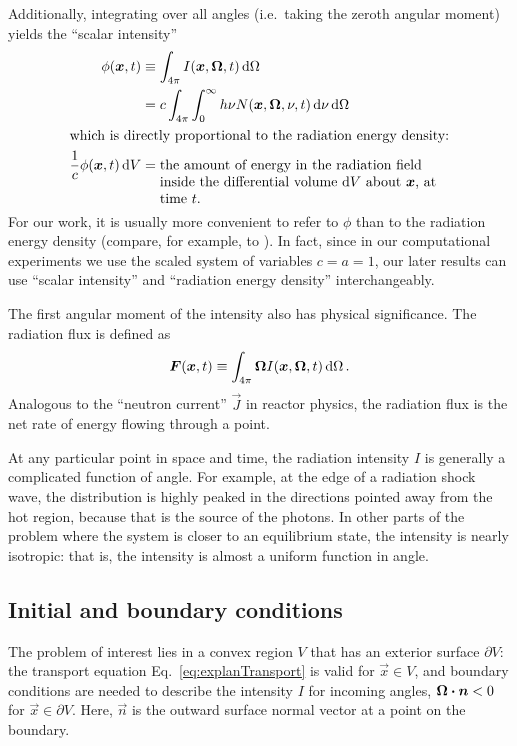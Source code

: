 Additionally, integrating over all angles (i.e.~taking the zeroth angular
moment) yields the ``scalar intensity''
\begin{align} \label{eq:intensityZeroth}
  \phi(\vec{x},t) &\equiv \int_{4\pi} I(\vec{x},\vec{\Omega}, t) \ud \Omega
  \\
  &= c \int_{4\pi} \int_0^\infty h\nu N(\vec{x},\vec{\Omega},\nu, t) \ud\nu
   \ud \Omega
\\ \intertext{which is directly proportional to the radiation energy density:}
\nonumber
\frac{1}{c} \phi(\vec{x},t) \ud V
&= \topbox{the amount of energy in the radiation field inside the differential
  volume $\ud V$ about $\vec{x}$, at time $t$.}
\end{align}
For our work, it is usually more convenient to refer to $\phi$ than to the
radiation energy density (compare, for example, \cite{Den2007} to
\cite{Kno1999a}). In fact, since in our computational experiments we use the
scaled system of variables $c=a=1$, our later results can use ``scalar
intensity'' and ``radiation energy density'' interchangeably.

The first angular moment of the intensity also has physical significance. The
radiation flux is defined as
\begin{equation} \label{eq:intensityFirst}
  \bm{F}(\bm{x},t) \equiv \int_{4\pi} \bm{\Omega}
  I(\bm{x},\bm{\Omega}, t) \mathop{}\!\mathrm{d} \Omega \,.
\end{equation}
Analogous to the ``neutron current'' $\vec{J}$ in reactor physics, the
radiation flux is the net rate of energy flowing through a point.

At any particular point in space and time, the radiation intensity $I$ is
generally a complicated function of angle. For example, at the edge of a
radiation shock wave, the distribution is highly peaked in the directions
pointed away from the hot region, because that is the source of the photons. In
other parts of the problem where the system is closer to an equilibrium state,
the intensity is nearly isotropic: that is, the intensity is almost a uniform
function in angle.

\subsection{Initial and boundary conditions}
The problem of interest lies in a convex region $V$ that has an exterior surface
$\partial V$: the transport equation Eq.~\eqref{eq:explanTransport} is valid
for $\vec{x} \in V$, and boundary conditions are needed to describe the
intensity $I$ for incoming angles, $\bm{\Omega}\bm{\cdot} \bm{n} < 0$ for $\vec{x}\in
\partial V$. Here, $\vec{n}$ is the outward surface normal vector at a point on
the boundary.

